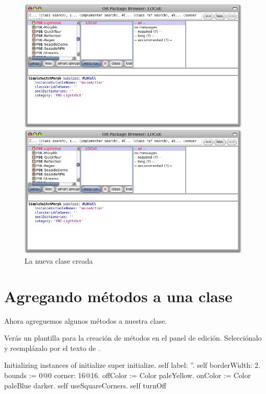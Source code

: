 \documentclass[a4paper,10pt,twoside]{book}
\begin{document}
\begin{figure}[h!t]
\ifluluelse
	{\centerline {\includegraphics[width=\textwidth]{LOCell}}}
	{\centerline {\includegraphics[scale=0.7]{LOCell}}}
\caption{La nueva clase creada }
\end{figure}


\section{Agregando m\'etodos a una clase}

Ahora agreguemos algunos m\'etodos a nuestra clase.

Ver\'as un plantilla para la creaci\'on de m\'etodos en el panel de edici\'on.
Selecci\'onalo y reempl\'azalo por el texto de .

\begin{numMethod}[scbecellinitialize]{Initializing instances of }
initialize
   super initialize.
   self label: ''.
   self borderWidth: 2.
   bounds := 0@0 corner: 16@16.
   offColor := Color paleYellow.
   onColor := Color paleBlue darker.
   self useSquareCorners.
   self turnOff
\end{numMethod}
\end{document}

